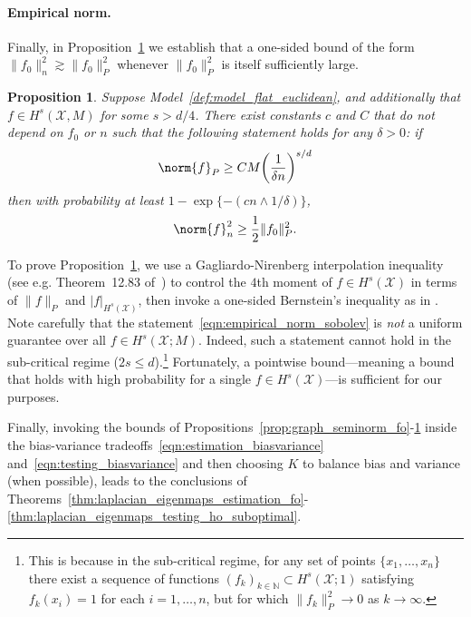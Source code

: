 \documentclass{article}
\newcommand{\1}{\mathbf{1}}
\newcommand{\Xset}{\mathcal{X}}
\newcommand{\mc}[1]{\mathcal{#1}}
\theoremstyle{alden}
\theoremstyle{aldenthm}
\newtheorem{proposition}{Proposition}
\theoremstyle{definition}
\theoremstyle{remark}
\begin{document}
\paragraph{Empirical norm.}
Finally, in Proposition~\ref{prop:empirical_norm_sobolev} we establish that a one-sided bound of the form $\|f_0\|_n^2 \gtrsim \|f_0\|_P^2$ whenever $\|f_0\|_P^2$ is itself sufficiently large.
\begin{proposition}
	\label{prop:empirical_norm_sobolev}
	Suppose Model~\ref{def:model_flat_euclidean}, and additionally that $f \in H^s(\Xset,M)$ for some $s > d/4$. There exist constants $c$ and $C$ that do not depend on $f_0$ or $n$ such that the following statement holds for any $\delta > 0$:  if
	\begin{equation}
	\label{eqn:empirical_norm_sobolev_1}
	\norm{f}_{P} \geq C M \biggl(\frac{1}{\delta n}\biggr)^{s/d}
	\end{equation}
	then with probability at least $1 - \exp\{-(cn \wedge 1/\delta)\}$,
	\begin{equation}
	\label{eqn:empirical_norm_sobolev}
	\norm{f}_n^2 \geq \frac{1}{2} \|f_0\|_P^2.
	\end{equation}
\end{proposition}
To prove Proposition~\ref{prop:empirical_norm_sobolev}, we use a Gagliardo-Nirenberg interpolation inequality (see e.g. Theorem~12.83 of~\citep{leoni2017}) to control the $4$th moment of $f \in H^s(\mc{X})$ in terms of $\|f\|_P$ and $|f|_{H^s(\mc{X})}$, then invoke a one-sided Bernstein's inequality as in \cite[Section 14.2]{wainwright2019}. Note carefully that the statement~\eqref{eqn:empirical_norm_sobolev} is \emph{not} a uniform guarantee over all $f \in H^s(\mc{X};M)$. Indeed, such a statement cannot hold in the sub-critical regime ($2s \leq d$).\footnote{This is because in the sub-critical regime, for any set of points $\{x_1,\ldots,x_n\}$ there exist a sequence of functions $(f_k)_{k \in \mathbb{N}} \subset H^s(\mc{X};1)$ satisfying $f_k(x_i) = 1$ for each $i = 1,\ldots,n$, but for which $\|f_k\|_P^2 \to 0$ as $k \to \infty$.} Fortunately, a pointwise bound---meaning a bound that holds with high probability for a single $f \in H^s(\mc{X})$---is sufficient for our purposes.

Finally, invoking the bounds of Propositions~\ref{prop:graph_seminorm_fo}-\ref{prop:empirical_norm_sobolev} inside the bias-variance tradeoffs~\eqref{eqn:estimation_biasvariance} and~\eqref{eqn:testing_biasvariance} and then choosing $K$ to balance bias and variance (when possible), leads to the conclusions of Theorems~\ref{thm:laplacian_eigenmaps_estimation_fo}-\ref{thm:laplacian_eigenmaps_testing_ho_suboptimal}.
\end{document}
